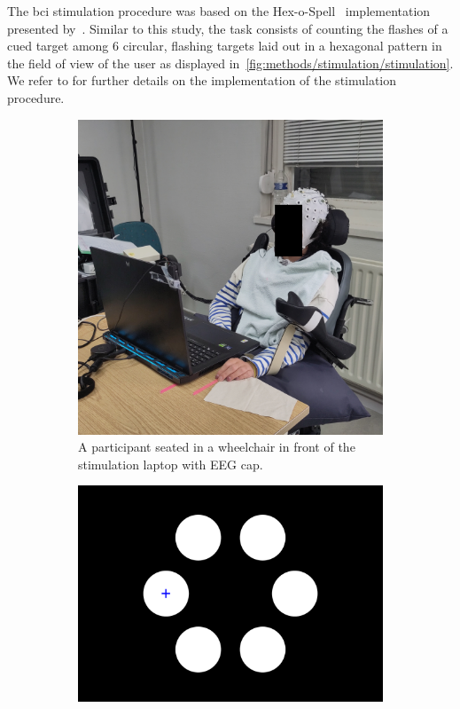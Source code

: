 \documentclass[twocolumn]{article}
\begin{document}
The \ac{bci} stimulation procedure was based on the
Hex-o-Spell~\cite{Treder2010} implementation presented
by~\textcite{VanDenKerchove2024}.
Similar to this study, the task consists of counting the flashes of a cued
target among 6 circular, flashing targets laid out in a hexagonal pattern in the
field of view of the user as displayed
in~\cref{fig:methods/stimulation/stimulation}.
We refer to \textcite{VanDenKerchove2024} for further details on the implementation
of the stimulation procedure.
\begin{figure}[t]
	\centering
	\begin{subfigure}[b]{.41\textwidth}
		\includegraphics[width=\textwidth]{figures/PD01b-obfuscated.jpg}
		\caption{A participant seated in a wheelchair in front of the stimulation laptop with EEG
			cap.}
	\end{subfigure}\hfill%
	\begin{minipage}[b]{.54\textwidth}
		\begin{subfigure}[b]{.45\linewidth}
			\includegraphics[width=\textwidth]{figures/stim_overt.pdf}

\end{subfigure}
\end{minipage}
\end{figure}
\end{document}
